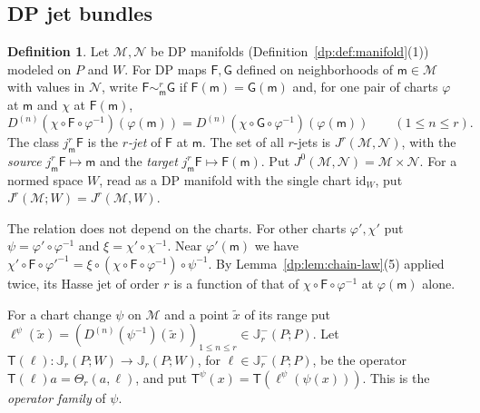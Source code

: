 \documentclass[11pt]{amsart}
\theoremstyle{definition}
\newtheorem{definition}[theorem]{Definition}
\theoremstyle{remark}
\numberwithin{equation}{section}
\newcommand{\id}{\mathrm{id}}
\theoremstyle{plain}
\theoremstyle{definition}
\theoremstyle{plain}
\begin{document}
\subsection{DP jet bundles}\label{dp:ssec:jets}

\begin{definition}\label{dp:def:jets}
Let $\mathcal M,\mathcal N$ be DP manifolds (Definition~\ref{dp:def:manifold}(1)) modeled on $P$ and $W$. For DP maps $\mathsf F,\mathsf G$ defined on neighborhoods of $\mathsf m\in\mathcal M$ with values in $\mathcal N$, write $\mathsf F\sim^r_{\mathsf m}\mathsf G$ if $\mathsf F(\mathsf m)=\mathsf G(\mathsf m)$ and, for one pair of charts $\varphi$ at $\mathsf m$ and $\chi$ at $\mathsf F(\mathsf m)$,
\[
 D^{(n)}(\chi\circ\mathsf F\circ\varphi^{-1})(\varphi(\mathsf m))=D^{(n)}(\chi\circ\mathsf G\circ\varphi^{-1})(\varphi(\mathsf m))\qquad(1\le n\le r).
\]
The class $j^r_{\mathsf m}\mathsf F$ is the \emph{$r$-jet} of $\mathsf F$ at $\mathsf m$. The set of all $r$-jets is $J^r(\mathcal M,\mathcal N)$, with the \emph{source} $j^r_{\mathsf m}\mathsf F\mapsto\mathsf m$ and the \emph{target} $j^r_{\mathsf m}\mathsf F\mapsto\mathsf F(\mathsf m)$. Put $J^0(\mathcal M,\mathcal N)=\mathcal M\times\mathcal N$. For a normed space $W$, read as a DP manifold with the single chart $\id_W$, put $J^r(\mathcal M;W)=J^r(\mathcal M,W)$.
\end{definition}

The relation does not depend on the charts. For other charts $\varphi',\chi'$ put $\psi=\varphi'\circ\varphi^{-1}$ and $\xi=\chi'\circ\chi^{-1}$. Near $\varphi'(\mathsf m)$ we have $\chi'\circ\mathsf F\circ\varphi'^{-1}=\xi\circ(\chi\circ\mathsf F\circ\varphi^{-1})\circ\psi^{-1}$. By Lemma~\ref{dp:lem:chain-law}(5) applied twice, its Hasse jet of order $r$ is a function of that of $\chi\circ\mathsf F\circ\varphi^{-1}$ at $\varphi(\mathsf m)$ alone.

For a chart change $\psi$ on $\mathcal M$ and a point $\tilde x$ of its range put $\ell^\psi(\tilde x)=(D^{(n)}(\psi^{-1})(\tilde x))_{1\le n\le r}\in\mathbb J^-_r(P;P)$. Let $\mathsf T(\ell)\colon\mathbb J_r(P;W)\to\mathbb J_r(P;W)$, for $\ell\in\mathbb J^-_r(P;P)$, be the operator $\mathsf T(\ell)a=\Theta_r(a,\ell)$, and put $\mathsf T^\psi(x)=\mathsf T(\ell^\psi(\psi(x)))$. This is the \emph{operator family} of $\psi$.
\end{document}
